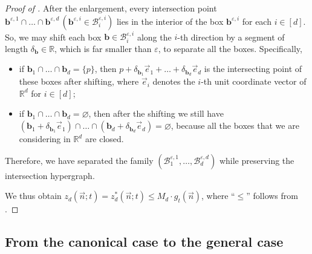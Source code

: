 \documentclass[11pt]{article}
\theoremstyle{definition}
\newcommand*{\veps}{\varepsilon}                                %
\newcommand*{\R}{\mathbb{R}}                                    %
\newcommand*{\cB}{\mathcal{B}}
\newcommand*{\vn}{\vec{n}}
\begin{document}
\begin{proof}[Proof of ]
    After the enlargement, every intersection point $\bm{b}^{\veps, 1} \cap \dots \cap \bm{b}^{\veps, d} \, (\bm{b}^{\veps, i} \in \cB_i^{\veps, i})$ lies in the interior of the box $\bm{b}^{\veps, i}$ for each $i \in [d]$. So, we may shift each box $\bm{b} \in \cB_i^{\veps, i}$ along the $i$-th direction by a segment of length $\delta_{\bm{b}} \in \mathbb{R}$, which is far smaller than $\veps$, to separate all the boxes. Specifically, 
    \vspace{-0.5em}
    \begin{itemize}
        \item if $\bm{b}_1 \cap \dots \cap \bm{b}_d = \{p\}$, then $p + \delta_{\bm{b}_1} \vec{e}_1 + \dots + \delta_{\bm{b}_d} \vec{e}_d$ is the intersecting point of these boxes after shifting, where $\vec{e}_i$ denotes the $i$-th unit coordinate vector of $\R^d$ for $i \in [d]$; 
        \vspace{-0.5em}
        \item if $\bm{b}_1 \cap \dots \cap \bm{b}_d = \varnothing$, then after the shifting we still have $(\bm{b}_1 + \delta_{\bm{b}_1} \vec{e}_1) \cap \dots \cap (\bm{b}_d + \delta_{\bm{b}_d} \vec{e}_d) = \varnothing$, because all the boxes that we are considering in $\R^d$ are closed. 
    \end{itemize}
    \vspace{-0.5em}
    Therefore, we have separated the family $(\cB_1^{\veps,1}, \dots, \cB_d^{\veps,d})$ while preserving the intersection hypergraph. 

    We thus obtain $z_d(\vn; t) = z_d^*(\vn; t) \le M_d \cdot g_t(\vn)$, where ``$\le$'' follows from . 
\end{proof}

\subsection{From the canonical case to the general case} \label{sec:upper_general}
\end{document}
